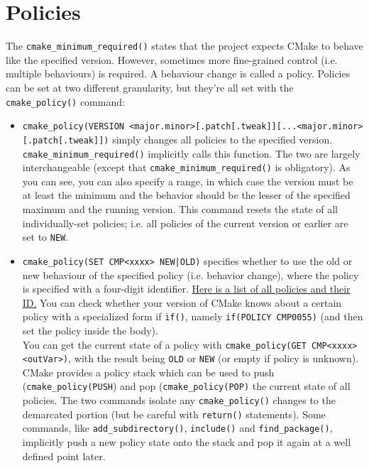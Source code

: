 \documentclass[table, xcdraw]{article}%
\begin{document}
\section{Policies}

The \texttt{cmake_minimum_required()} states that the project expects CMake to behave like the specified version. However, sometimes more fine-grained control (i.e. multiple behaviours) is required. A behaviour change is called a policy. Policies can be set at two different granularity, but they're all set with the \texttt{cmake_policy()} command:

\begin{itemize}
    \item \texttt{cmake_policy(VERSION <major.minor>[.patch[.tweak]][...<major.minor>[.patch[.tweak]])} simply changes all policies to the specified version. \texttt{cmake_minimum_required()} implicitly calls this function. The two are largely interchangeable (except that \texttt{cmake_minimum_required()} is obligatory). As you can see, you can also specify a range, in which case the version must be at least the minimum and the behavior should be the lesser of the specified maximum and the running version. This command resets the state of all individually-set policies; i.e. all policies of the current version or earlier are set to \texttt{NEW}.
    \item \texttt{cmake_policy(SET CMP<xxxx> NEW|OLD)} specifies whether to use the old or new behaviour of the specified policy (i.e. behavior change), where the policy is specified with a four-digit identifier. \href{https://cmake.org/cmake/help/latest/manual/cmake-policies.7.html}{Here is a list of all policies and their ID.} You can check whether your version of CMake knows about a certain policy with a specialized form if \texttt{if()}, namely \texttt{if(POLICY CMP0055)} (and then set the policy inside the body).\\
    You can get the current state of a policy with \texttt{cmake_policy(GET CMP<xxxx> <outVar>)}, with the result being \texttt{OLD} or \texttt{NEW} (or empty if policy is unknown).\\
    CMake provides a policy stack which can be used to push (\texttt{cmake_policy(PUSH}) and pop (\texttt{cmake_policy(POP)} the current state of all policies. The two commands isolate any \texttt{cmake_policy()} changes to the demarcated portion (but be careful with \texttt{return()} statements). Some commands, like \texttt{add_subdirectory()}, \texttt{include()} and \texttt{find_package()}, implicitly push a new policy state onto the stack and pop it again at a well defined point later.
\end{itemize}
\end{document}
